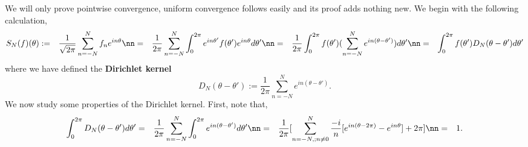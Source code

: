 \bpru We will only prove pointwise convergence, uniform convergence follows easily and its proof adds nothing new. We begin with the following calculation, \begin{eqnarray} S_N(f)(\theta) &:=& \frac{1}{\sqrt{2\pi}}\sum_{n=-N}^{N} f_n e^{in\theta} \nn &=& \frac{1}{{2\pi}}\sum_{n=-N}^{N} \int_0^{2\pi}e^{in\theta'}f(\theta') e^{in\theta}d\theta' \nn &=& \frac{1}{{2\pi}}\int_0^{2\pi}f(\theta') (\sum_{n=-N}^{N}e^{in(\theta-\theta')})d\theta' \nn &=& \int_0^{2\pi}f(\theta')D_N(\theta-\theta')d\theta'
\end{eqnarray} where we have defined the \textbf{Dirichlet kernel}~ \begin{equation} D_N(\theta-\theta'):= \frac{1}{{2\pi}}\sum_{n=-N}^{N}e^{in(\theta-\theta')}. \end{equation} We now study some properties of the Dirichlet kernel. First, note that, \begin{eqnarray} \label{eqn:nucleo=1} \int_0^{2\pi}D_N(\theta-\theta')d\theta' &=& \frac{1}{{2\pi}}\sum_{n=-N}^{N} \int_0^{2\pi}e^{in(\theta-\theta')}d\theta' \nn &=& \frac{1}{{2\pi}}[ \sum_{n=-N,;n\neq0}^{N}\frac{-i}{n} [e^{in(\theta-2\pi)}-e^{in\theta}] + 2\pi] \nn &=& 1. \end{eqnarray} %

